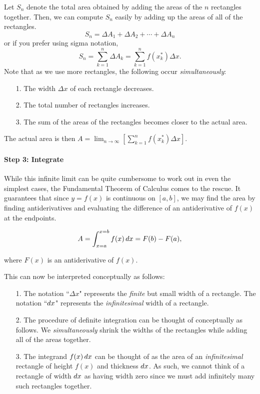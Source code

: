 \documentclass{ximera}
\begin{document}
Let $S_n$ denote the total area obtained by adding the areas of the $n$ rectangles together.   Then, we can compute $S_n$ easily by adding up the areas of all of the rectangles. $$S_n = \Delta A_1 + \Delta A_2 + \cdots +\Delta A_n$$
or if you prefer using sigma notation, 
\begin{equation}
S_n =\sum_{k=1}^{n} \Delta A_k =  \sum_{k=1}^n f(x_k^*) \Delta x. 
\end{equation}
Note that as we use more rectangles, the following occur \emph{simultaneously}:

\begin{itemize}
\item[1.] The width $\Delta x$ of each rectangle decreases.
\item[2.] The total number of rectangles increases.
\item[3.] The sum of the areas of the rectangles becomes closer to the actual area.
\end{itemize}

The actual area is then $A = \lim_{n \rightarrow \infty} \left[ \sum_{k=1}^n f(x_k^*) \Delta x \right]$.


\paragraph{Step 3: Integrate}

While this infinite limit can be quite cumbersome to work out in even the simplest cases, the Fundamental Theorem of Calculus comes to the rescue.  It guarantees that since $y=f(x)$ is continuous on $[a,b]$, we may find the area by finding antiderivatives and evaluating the difference of an antiderivative of $f(x)$ at the endpoints.

\[A = \int_{x=a}^{x=b} f(x) \mathop{}\!d x = F(b)-F(a) ,\]

where $F(x)$ is an antiderivative of $f(x)$.

This can now be interpreted conceptually as follows:
\begin{itemize}
\item[1.] The notation ``$\Delta x$" represents the \emph{finite} but small width of a rectangle.  The notation ``$\mathop{}\!d x$" represents the \emph{infinitesimal} width of a rectangle.
\item[2.] The procedure of definite integration can be thought of conceptually as follows.  We \emph{simultaneously} shrink the widths of the rectangles while adding all of the areas together.  
\item[3.] The integrand $f(x) \mathop{}\!d x$ can be thought of as the area of an \emph{infinitesimal} rectangle of height $f(x)$ and thickness $\mathop{}\!d x$.  As such, we cannot think of a rectangle of width $\mathop{}\!d x$ as having width zero since we must add infinitely many such rectangles together. 
\end{itemize}
\end{document}
